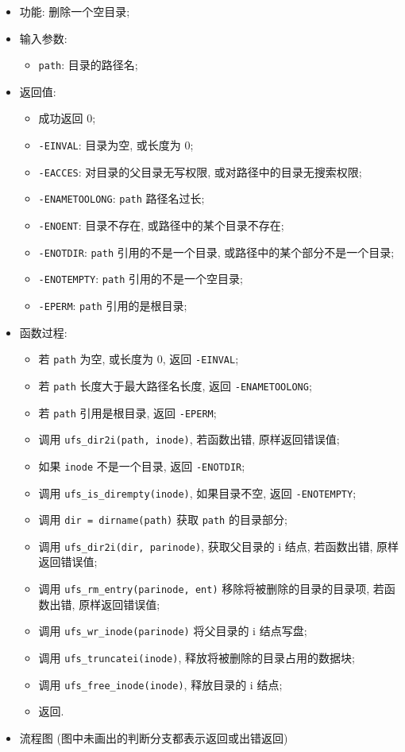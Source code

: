 \documentclass[nofonts, titlepage]{ctexart}
\begin{document}
  \begin{itemize}
\item
  功能: 删除一个空目录;
\item
  输入参数:

  \begin{itemize}
  \item
    \texttt{path}: 目录的路径名;
  \end{itemize}
\item
  返回值:

  \begin{itemize}
  \item
    成功返回 0;
  \item
    \texttt{-EINVAL}: 目录为空, 或长度为 0;
  \item
    \texttt{-EACCES}: 对目录的父目录无写权限,
    或对路径中的目录无搜索权限;
  \item
    \texttt{-ENAMETOOLONG}: \texttt{path} 路径名过长;
  \item
    \texttt{-ENOENT}: 目录不存在, 或路径中的某个目录不存在;
  \item
    \texttt{-ENOTDIR}: \texttt{path} 引用的不是一个目录,
    或路径中的某个部分不是一个目录;
  \item
    \texttt{-ENOTEMPTY}: \texttt{path} 引用的不是一个空目录;
  \item
    \texttt{-EPERM}: \texttt{path} 引用的是根目录;
  \end{itemize}
\item
  函数过程:

  \begin{itemize}
  \item
    若 \texttt{path} 为空, 或长度为 0, 返回 \texttt{-EINVAL};
  \item
    若 \texttt{path} 长度大于最大路径名长度, 返回
    \texttt{-ENAMETOOLONG};
  \item
    若 \texttt{path} 引用是根目录, 返回 \texttt{-EPERM};
  \item
    调用 \texttt{ufs\_dir2i(path, inode)}, 若函数出错, 原样返回错误值;
  \item
    如果 \texttt{inode} 不是一个目录, 返回 \texttt{-ENOTDIR};
  \item
    调用 \texttt{ufs\_is\_dirempty(inode)}, 如果目录不空, 返回
    \texttt{-ENOTEMPTY};
  \item
    调用 \texttt{dir = dirname(path)} 获取 \texttt{path} 的目录部分;
  \item
    调用 \texttt{ufs\_dir2i(dir, parinode)}, 获取父目录的 i 结点,
    若函数出错, 原样返回错误值;
  \item
    调用 \texttt{ufs\_rm\_entry(parinode, ent)}
    移除将被删除的目录的目录项, 若函数出错, 原样返回错误值;
  \item
    调用 \texttt{ufs\_wr\_inode(parinode)} 将父目录的 i 结点写盘;
  \item
    调用 \texttt{ufs\_truncatei(inode)}, 释放将被删除的目录占用的数据块;
  \item
    调用 \texttt{ufs\_free\_inode(inode)}, 释放目录的 i 结点;
  \item
    返回.
  \end{itemize}
\item
  流程图
  (图中未画出的判断分支都表示返回或出错返回)


\end{itemize}
\end{document}
